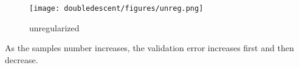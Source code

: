 
\begin{answer}
\begin{figure}[H]
  \centering
  \texttt{[image: doubledescent/figures/unreg.png]}
  \caption{unregularized}
\end{figure}
As the samples number increases, the validation error increases first and then decrease. 
\end{answer}
